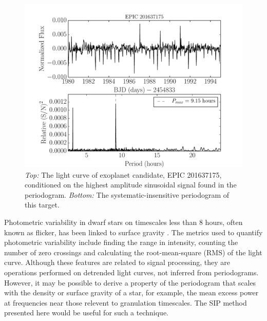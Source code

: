 \documentclass[useAMS, usenatbib, preprint, 12pt]{aastex}
\begin{document}
\begin{figure}
\begin{center}
\includegraphics[width=6in, clip=true]{planet_201637175.pdf}
\caption{{\it Top:} The light curve of exoplanet candidate, EPIC 201637175,
	conditioned on the highest amplitude sinusoidal signal found in the
	periodogram. {\it Bottom:} The systematic-insensitive periodogram of
	this target.}
\label{fig:planet}
\end{center}
\end{figure}


Photometric variability in dwarf stars on timescales less than 8 hours, often
known as flicker, has been linked to surface gravity
\citep[][]{Bastien2013, Kipping2014}.
The metrics used to quantify photometric variability include finding the range
in intensity, counting the number of zero crossings and calculating the
root-mean-square (RMS) of the light curve.
Although these features are related to signal processing, they are operations
performed on detrended light curves, not inferred from periodograms.
However, it may be possible to derive a property of the periodogram that scales
with the density or surface gravity of a star, for example, the mean excess
power at frequencies near those relevent to granulation timescales.
The SIP method presented here would be useful for such a technique.
\end{document}
